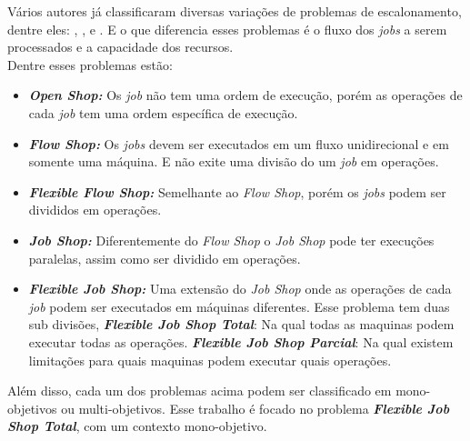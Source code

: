         Vários autores já classificaram diversas variações de problemas de escalonamento, dentre eles: \cite{graham1979}, \cite{Lenstra1979}, e \cite{maccarthy1993}. E o que diferencia esses problemas é o fluxo dos \textit{jobs} a serem processados e a capacidade dos recursos.\\
        \noindent Dentre esses problemas estão:
        \begin{itemize}
            \item \textbf{\textit{Open Shop:}} Os \textit{job} não tem uma ordem de execução, porém as operações de cada \textit{job} tem uma ordem específica de execução.
            
            \item \textbf{\textit{Flow Shop:}} Os \textit{jobs} devem ser executados em um fluxo unidirecional e em somente uma máquina. E não exite uma divisão do um \textit{job} em operações.
            
            \item \textbf{\textit{Flexible Flow Shop:}} Semelhante ao \textit{Flow Shop}, porém os \textit{jobs} podem ser divididos em operações.
            
            \item \textbf{\textit{Job Shop:}} Diferentemente do \textit{Flow Shop} o \textit{Job Shop} pode ter execuções paralelas, assim como ser dividido em operações.
            
            \item \textbf{\textit{Flexible Job Shop:}} Uma extensão do \textit{Job Shop} onde as operações de cada \textit{job} podem ser executados em máquinas diferentes. Esse problema tem duas sub divisões, 
            \subitem \textbf{\textit{Flexible Job Shop Total}}: Na qual todas as maquinas podem executar todas as operações. 
            \subitem \textbf{\textit{Flexible Job Shop Parcial}}: Na qual existem limitações para quais maquinas podem executar quais operações.
        \end{itemize}

        \noindent Além disso, cada um dos problemas acima podem ser classificado em mono-objetivos ou multi-objetivos. Esse trabalho é focado no problema \textbf{\textit{Flexible Job Shop Total}}, com um contexto mono-objetivo.\\
        
